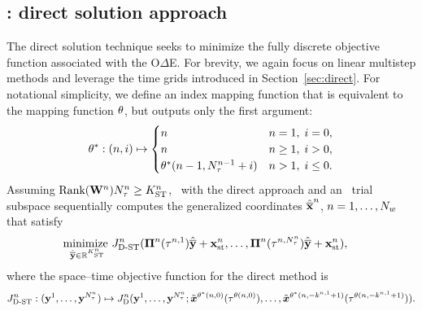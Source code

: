 \subsection{\spaceTimeAcronym: direct solution approach}
The direct solution technique seeks to minimize the fully discrete objective function associated with the O$\Delta$E. For brevity, we again focus on linear multistep methods and leverage the time grids introduced in Section~\ref{sec:direct}. For notational simplicity, we define an index mapping function that is 
equivalent to the mapping function $\theta$, but outputs only the first argument: 
$$\theta^*: (n,i) \mapsto 
\begin{cases}
n & n = 1, \; i = 0, \\
n & n \ge 1, \; i > 0, \\
\theta^*(n-1,N_{\tau}^{n-1}+i) & n > 1, \; i \le 0.
\end{cases}$$
Assuming $\text{Rank}(\mathbf{W}^{n})N_{\tau}^{n} \ge K_{\text{ST}}^{n}$, \methodAcronym\ with the direct approach and an \spaceTimeAcronym\ trial subspace sequentially computes the generalized coordinates $\hat{\mathbf{\overline{x}}}^{n}$, $n=1,\ldots,N_w$ that satisfy
 \begin{equation}\label{eq:obj_gen_lms_final_st}
\begin{split}
& \underset{\stgenstatey \in \RR{\stdimArg{n}}}{\text{minimize } }
\objectiveArgLMS{n}_{\text{D-ST}} (\stbasisArg{n}{\timeWindowArg{n}{1}} \stgenstatey + \stateInterceptSTArg{n},\ldots,\stbasisArg{n}{\timeWindowArg{n}{\nstepsArg{n}}} \stgenstatey + \stateInterceptSTArg{n}),%
\end{split} 
\end{equation}
where the space--time objective function for the direct method is
$$
J^{n}_{\text{D-ST}}  :  (\mathbf{y}^{1},\ldots,\mathbf{y}^{N_{\tau}^{n}}) \mapsto J^{n}_{\text{D}}(\mathbf{y}^{1},\ldots,\mathbf{y}^{N_{\tau}^{n}}; \tilde{\boldsymbol x}^{\theta^*(n,0)}(\tau^{\theta(n,0)}),\ldots, 
 \tilde{\boldsymbol x}^{\theta^*(n,-k^{n,1}+1)}(\tau^{\theta(n,-k^{n,1}+1)})).
$$
